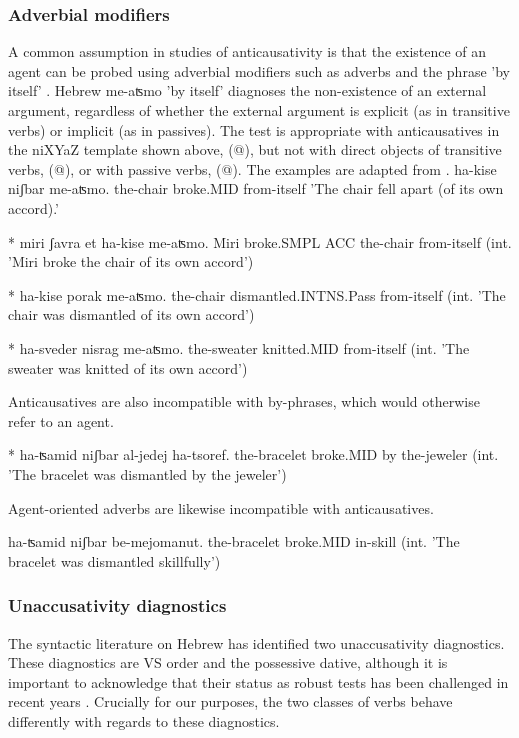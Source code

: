 		\subsubsection{Adverbial modifiers}
A common assumption in studies of anticausativity is that the existence of an agent can be probed using adverbial modifiers such as adverbs and the phrase 'by itself' \citep{unaccusativity95,alexiadouanagnostopoulou04,koontzgarboden09,alexiadoudoron12,kastner17gjgl}. Hebrew me-aʦmo 'by itself' diagnoses the non-existence of an external argument, regardless of whether the external argument is explicit (as in transitive verbs) or implicit (as in passives). The test is appropriate with anticausatives in the niXYaZ template shown above, (@), but not with direct objects of transitive verbs, (@), or with passive verbs, (@). The examples are adapted from \cite{kastner17gjgl}.
    ha-kise niʃbar me-aʦmo.
       the-chair broke.MID from-itself
       'The chair fell apart (of its own accord).'
    
* miri ʃavra et ha-kise me-aʦmo.
       Miri broke.SMPL ACC the-chair from-itself
         (int. 'Miri broke the chair of its own accord')
     
         * ha-kise porak me-aʦmo.
         the-chair dismantled.INTNS.Pass from-itself
         (int. 'The chair was dismantled of its own accord')
    
         * ha-sveder nisrag me-aʦmo.
         the-sweater knitted.MID from-itself
         (int. 'The sweater was knitted of its own accord')
    
Anticausatives are also incompatible with by-phrases, which would otherwise refer to an agent.

     * ha-ʦamid niʃbar al-jedej ha-tsoref.
     the-bracelet broke.MID by the-jeweler
     (int. 'The bracelet was dismantled by the jeweler')

Agent-oriented adverbs are likewise incompatible with anticausatives.

     ha-ʦamid niʃbar be-mejomanut.
     the-bracelet broke.MID in-skill
     (int. 'The bracelet was dismantled skillfully')
 
		\subsubsection{Unaccusativity diagnostics}

The syntactic literature on Hebrew has identified two unaccusativity diagnostics. These diagnostics are VS order and the possessive dative, although it is important to acknowledge that their status as robust tests has been challenged in recent years \citep{gafter14li,linzen14pd,kastner17gjgl}. Crucially for our purposes, the two classes of verbs behave differently with regards to these diagnostics.

